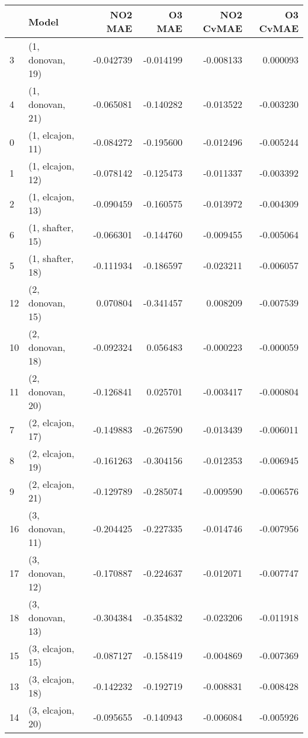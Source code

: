 \begin{tabular}{llrrrr}
\toprule
{} &             Model &   NO2 MAE &    O3 MAE &  NO2 CvMAE &  O3 CvMAE \\
\midrule
3  &  (1, donovan, 19) & -0.042739 & -0.014199 &  -0.008133 &  0.000093 \\
4  &  (1, donovan, 21) & -0.065081 & -0.140282 &  -0.013522 & -0.003230 \\
0  &  (1, elcajon, 11) & -0.084272 & -0.195600 &  -0.012496 & -0.005244 \\
1  &  (1, elcajon, 12) & -0.078142 & -0.125473 &  -0.011337 & -0.003392 \\
2  &  (1, elcajon, 13) & -0.090459 & -0.160575 &  -0.013972 & -0.004309 \\
6  &  (1, shafter, 15) & -0.066301 & -0.144760 &  -0.009455 & -0.005064 \\
5  &  (1, shafter, 18) & -0.111934 & -0.186597 &  -0.023211 & -0.006057 \\
12 &  (2, donovan, 15) &  0.070804 & -0.341457 &   0.008209 & -0.007539 \\
10 &  (2, donovan, 18) & -0.092324 &  0.056483 &  -0.000223 & -0.000059 \\
11 &  (2, donovan, 20) & -0.126841 &  0.025701 &  -0.003417 & -0.000804 \\
7  &  (2, elcajon, 17) & -0.149883 & -0.267590 &  -0.013439 & -0.006011 \\
8  &  (2, elcajon, 19) & -0.161263 & -0.304156 &  -0.012353 & -0.006945 \\
9  &  (2, elcajon, 21) & -0.129789 & -0.285074 &  -0.009590 & -0.006576 \\
16 &  (3, donovan, 11) & -0.204425 & -0.227335 &  -0.014746 & -0.007956 \\
17 &  (3, donovan, 12) & -0.170887 & -0.224637 &  -0.012071 & -0.007747 \\
18 &  (3, donovan, 13) & -0.304384 & -0.354832 &  -0.023206 & -0.011918 \\
15 &  (3, elcajon, 15) & -0.087127 & -0.158419 &  -0.004869 & -0.007369 \\
13 &  (3, elcajon, 18) & -0.142232 & -0.192719 &  -0.008831 & -0.008428 \\
14 &  (3, elcajon, 20) & -0.095655 & -0.140943 &  -0.006084 & -0.005926 \\
\bottomrule
\end{tabular}
